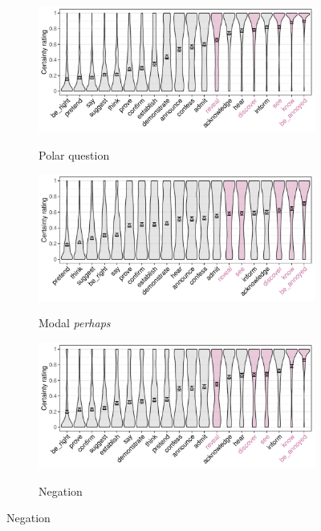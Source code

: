 \documentclass[a4paper,12pt,twoside]{article}
\begin{document}
        \begin{figure}[h!]
            \centering
            \begin{subfigure}[t]{0.57\textwidth}
            \caption{Polar question}
            \includegraphics[width = 1\linewidth]{question-predicate-graph.pdf}
            \label{fig:op-pred-ratings-q}
            \end{subfigure}

            \vspace{-\baselineskip}
            \begin{subfigure}[t]{0.57\textwidth}
            \caption{Modal \emph{perhaps}}
            \includegraphics[width = 1\linewidth]{modal-predicate-graph.pdf}
            \label{fig:op-pred-ratings-m}
            \end{subfigure}

            \vspace{-\baselineskip}
            \begin{subfigure}[t]{0.57\textwidth}
            \caption{Negation}
            \includegraphics[width = 1\linewidth]{negation-predicate-graph.pdf}
            \label{fig:op-pred-ratings-n}
            \end{subfigure}
            

\end{figure}
\end{document}
